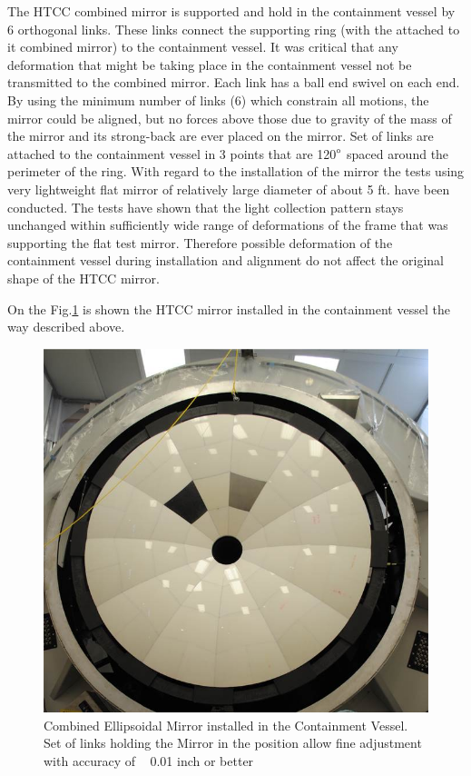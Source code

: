 \indent The HTCC combined mirror is supported and hold in the containment vessel by 6 orthogonal links. These links connect the supporting ring (with the attached to it combined mirror) to the containment vessel.
\indent It was critical that any deformation that might be taking place in the containment vessel not be transmitted to the combined mirror. Each link has a ball end swivel on each end. By using the minimum number of links (6) which constrain all motions, the mirror could be aligned, but no forces above those due to gravity of the mass of the mirror and its strong-back are ever placed on the mirror. Set of links are attached to the containment vessel in 3 points that are 120$\degree$ spaced around the perimeter of the ring. With regard to the installation of the mirror the tests using very lightweight flat mirror of relatively large diameter of about 5 ft. have been conducted. The tests have shown that the light collection pattern stays unchanged within sufficiently wide range of deformations of the frame that was supporting the flat test mirror. Therefore possible deformation of the containment vessel during installation and alignment do not affect the original shape of the HTCC mirror. 

On the Fig.\ref{fig:HTCC_MIRR_INST} is shown the HTCC mirror installed in the containment vessel the way described above.

\begin{figure}[h]
    \centering
    \includegraphics[width=1.0\linewidth,trim={0 0cm 0 0},clip]{images/HTCC_MIRR_INST.jpg}
    \caption{Combined Ellipsoidal Mirror installed in the Containment Vessel. Set of links holding the Mirror in the position allow fine adjustment with accuracy of ~ 0.01 inch or better}
    \label{fig:HTCC_MIRR_INST}
\end{figure}

